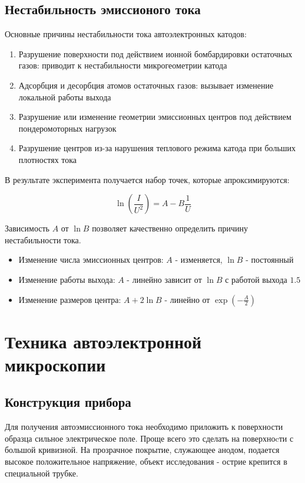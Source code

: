 \documentclass[12pt,a4paper]{article}
\begin{document}
\subsection{Нестабильность эмиссионого тока}
Основные причины нестабильности тока автоэлектронных катодов:
\begin{enumerate}
\item Разрушение поверхности под действием ионной бомбардировки остаточных газов: приводит к нестабильности микрогеометрии катода
\item Адсорбция и десорбция атомов остаточных газов: вызывает изменение локальной работы выхода
\item Разрушение или изменение геометрии эмиссионных центров под действием пондеромоторных нагрузок
\item Разрушение центров из-за нарушения теплового режима катода при больших плотностях тока
\end{enumerate}

В результате эксперимента получается набор точек, которые апроксимируются:

\begin{equation*}
\ln (\frac{I}{U^2}) = A - B \frac{1}{U}
\end{equation*}

Зависимость $A$ от $\ln B$ позволяет качественно определить причину нестабильности тока. 

\begin{itemize}
	\item Изменение числа эмиссионных центров: $A$ - изменяется, $\ln B$ - постоянный
	\item Изменение работы выхода: $A$ - линейно зависит от $\ln B$ с работой выхода $1.5$
	\item Изменение размеров центра: $A+2 \ln B$ - линейно от $\exp(-\frac{A}{2})$
\end{itemize}


\section{Техника автоэлектронной микроскопии} %
\label{sec:техника_автоэлектронной_микроскопии}

\subsection{Констpукция прибора} %
\label{sub:констуркция_прибора}
Для получения автоэмиссионного тока необходимо приложить к поверхности образца сильное электрическое поле. Проще всего это сделать на поверхноcти с большой кривизной. На прозрачное покрытие, служающее анодом, подается высокое положительное напряжение, объект исследования - острие крепится в специальной трубке.
\end{document}
